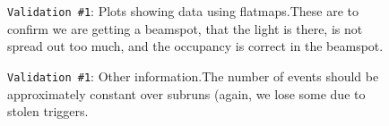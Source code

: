\documentclass[12pt]{article}
\begin{document}
\begin{figure}
\centering
\noindent{}
  \caption{\centering \texttt{Validation \#1}: Plots showing data using flatmaps.\hspace{\textwidth}These are to confirm we are getting a beamspot, that the light is there, is not spread out too much, and the occupancy is correct in the beamspot.}
  \label{fig:val13}
\end{figure}

\begin{figure}
\centering
\noindent{}
  \caption{\centering \texttt{Validation \#1}: Other information.\hspace{\textwidth}The number of events should be approximately constant over subruns (again, we lose some due to stolen triggers.}
  \label{fig:val14}
\end{figure}
\end{document}
